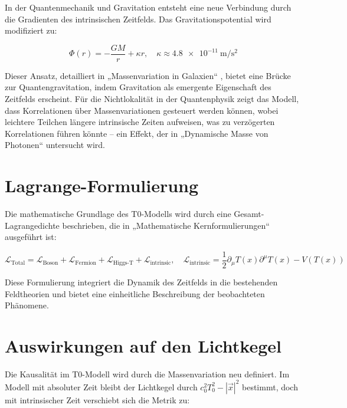 \documentclass[a4paper,12pt]{article}
\newcommand{\Tfield}{T(x)}
\begin{document}
	In der Quantenmechanik und Gravitation entsteht eine neue Verbindung durch die Gradienten des intrinsischen Zeitfelds. Das Gravitationspotential wird modifiziert zu:
	
	\begin{equation}
		\Phi(r) = -\frac{G M}{r} + \kappa r, \quad \kappa \approx \SI{4.8e-11}{\meter\per\second\squared}
	\end{equation}
	
	Dieser Ansatz, detailliert in „Massenvariation in Galaxien“ \cite{pascher_galaxies_2025}, bietet eine Brücke zur Quantengravitation, indem Gravitation als emergente Eigenschaft des Zeitfelds erscheint. Für die Nichtlokalität in der Quantenphysik zeigt das Modell, dass Korrelationen über Massenvariationen gesteuert werden können, wobei leichtere Teilchen längere intrinsische Zeiten aufweisen, was zu verzögerten Korrelationen führen könnte – ein Effekt, der in „Dynamische Masse von Photonen“ \cite{pascher_photons_2025} untersucht wird.
	
	\section{Lagrange-Formulierung}
	
	Die mathematische Grundlage des T0-Modells wird durch eine Gesamt-Lagrangedichte beschrieben, die in „Mathematische Kernformulierungen“ \cite{pascher_lagrange_2025} ausgeführt ist:
	
	\begin{equation}
		\mathcal{L}_{\text{Total}} = \mathcal{L}_{\text{Boson}} + \mathcal{L}_{\text{Fermion}} + \mathcal{L}_{\text{Higgs-T}} + \mathcal{L}_{\text{intrinsic}}, \quad \mathcal{L}_{\text{intrinsic}} = \frac{1}{2} \partial_\mu \Tfield \partial^\mu \Tfield - V(\Tfield)
	\end{equation}
	
	Diese Formulierung integriert die Dynamik des Zeitfelds in die bestehenden Feldtheorien und bietet eine einheitliche Beschreibung der beobachteten Phänomene.
	
	\section{Auswirkungen auf den Lichtkegel}
	
	Die Kausalität im T0-Modell wird durch die Massenvariation neu definiert. Im Modell mit absoluter Zeit bleibt der Lichtkegel durch \(c_0^2 T_0^2 - |\vec{x}|^2\) bestimmt, doch mit intrinsischer Zeit verschiebt sich die Metrik zu:
	
\end{document}

